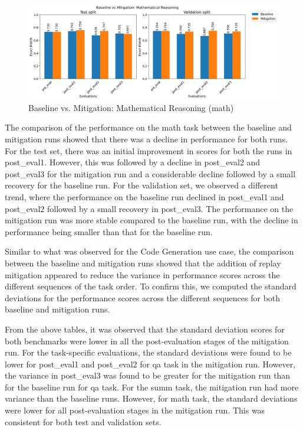 \begin{figure}[H]
    \centering
    \includegraphics[width=1.1\textwidth]{Figures/results/trace_comparisons/task_eval/comparison_task_math.png} 
    \caption{Baseline vs. Mitigation: Mathematical Reasoning (math)}
    \label{fig:MathTestComparison}
\end{figure}
The comparison of the performance on the math task between the baseline and mitigation runs showed that there was a decline in performance for both runs. For the test set, there was an initial improvement in scores for both the runs in post\_eval1. However, this was followed by a decline in post\_eval2 and post\_eval3 for the mitigation run and a considerable decline followed by a small recovery for the baseline run. For the validation set, we observed a different trend, where the performance on the baseline run declined in post\_eval1 and post\_eval2 followed by a small recovery in post\_eval3. The performance on the mitigation run was more stable compared to the baseline run, with the decline in performance being smaller than that for the baseline run.

Similar to what was observed for the Code Generation use case, the comparison between the baseline and mitigation runs showed that the addition of replay mitigation appeared to reduce the variance in performance scores across the different sequences of the task order. To confirm this, we computed the standard deviations for the performance scores across the different sequences for both baseline and mitigation runs.   



From the above tables, it was observed that the standard deviation scores for both benchmarks were lower in all the post-evaluation stages of the mitigation run. For the task-specific evaluations, the standard deviations were found to be lower for post\_eval1 and post\_eval2 for qa task in the mitigation run. However, the variance in post\_eval3 was found to be greater for the mitigation run than for the baseline run for qa task. For the summ task, the mitigation run had more variance than the baseline runs. However, for math task, the standard deviations were lower for all post-evaluation stages in the mitigation run. This was consistent for both test and validation sets.

